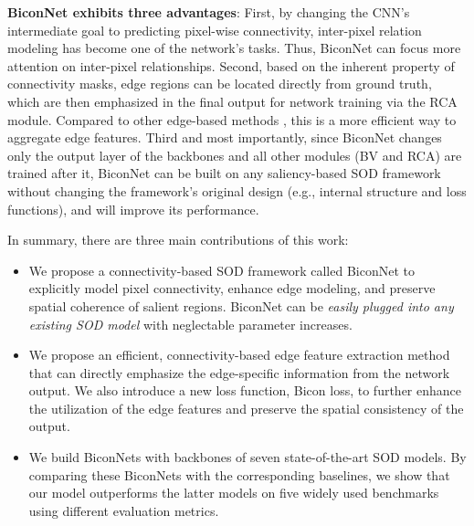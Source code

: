 \documentclass[review]{cvpr}
\begin{document}
\textbf{BiconNet exhibits three advantages}: First, by changing the CNN’s intermediate goal to predicting pixel-wise connectivity, inter-pixel relation modeling has become one of the network’s tasks. Thus, BiconNet can focus more attention on inter-pixel relationships. Second, based on the inherent property of connectivity masks, edge regions can be located directly from ground truth, which are then emphasized in the final output for network training via the RCA module. Compared to other edge-based methods \cite{egnet,poolnet}, this is a more efficient way to aggregate edge features. Third and most importantly, since BiconNet changes only the output layer of the backbones and all other modules (BV and RCA) are trained after it, BiconNet can be built on any saliency-based SOD framework without changing the framework’s original design (e.g., internal structure and loss functions), and will improve its performance. 

In summary, there are three main contributions of this work:

\begin{itemize}
\item We propose a connectivity-based SOD framework called BiconNet to explicitly model pixel connectivity, enhance edge modeling, and preserve spatial coherence of salient regions. BiconNet can be \textit{easily plugged into any existing SOD model} with neglectable parameter increases. 

\item We propose an efficient, connectivity-based edge feature extraction method that can directly emphasize the edge-specific information from the network output. We also introduce a new loss function, Bicon loss, to further enhance the utilization of the edge features and preserve the spatial consistency of the output.  

\item We build BiconNets with backbones of seven state-of-the-art SOD models. By comparing these BiconNets with the corresponding baselines, we show that our model outperforms the latter models on five widely used benchmarks using different evaluation metrics. 

\end{itemize}
\end{document}
